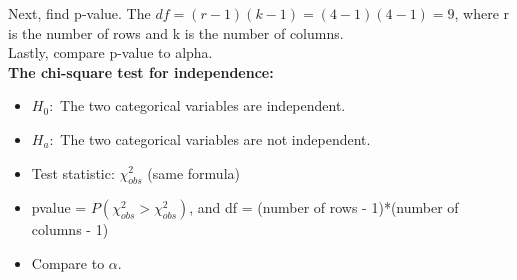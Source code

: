 \documentclass[12pt]{article}
\begin{document}
\noindent Next, find p-value. The $df = (r-1)(k-1) = (4-1)(4-1) = 9$, where r is the number of rows and k is the number of columns. \\

\noindent Lastly, compare p-value to alpha. \\

\noindent \textbf{The chi-square test for independence:}\\
\begin{itemize}
\item
$H_{0}:$ The two categorical variables are independent.
\item
$H_{a}:$ The two categorical variables are not independent.
\item
\noindent Test statistic: $\chi^{2}_{obs}$ (same formula)
\item
\noindent pvalue = $P(\chi^{2}_{obs} > \chi^{2}_{obs})$, and df = (number of rows - 1)*(number of columns - 1)
\item
\noindent Compare to $\alpha$.
\end{itemize}
\end{document}
